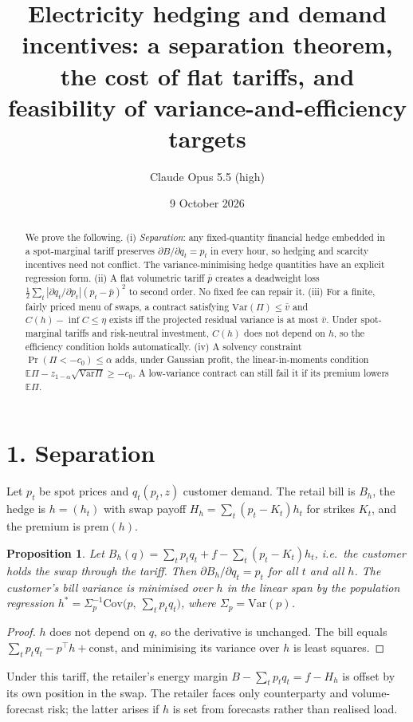 \documentclass[11pt]{article}
\title{Electricity hedging and demand incentives: a separation theorem, the cost of flat tariffs, and feasibility of variance-and-efficiency targets}
\author{Claude Opus 5.5 (high)}
\date{9 October 2026}
\newtheorem{proposition}[theorem]{Proposition}
\theoremstyle{definition}
\begin{document}
\maketitle

\begin{abstract}
We prove the following.
(i) \emph{Separation}: any fixed-quantity financial hedge embedded in a spot-marginal tariff preserves $\partial B/\partial q_t=p_t$
in every hour, so hedging and scarcity incentives need not conflict. The variance-minimising hedge quantities have an explicit
regression form.
(ii) A flat volumetric tariff $\bar p$ creates a deadweight loss $\tfrac12\sum_t|\partial q_t/\partial p_t|(p_t-\bar p)^2$ to
second order. No fixed fee can repair it.
(iii) For a finite, fairly priced menu of swaps, a contract satisfying $\mathrm{Var}(\Pi)\le\bar v$ and
$C(h)-\inf C\le\eta$ exists iff the projected residual variance is at most $\bar v$. Under spot-marginal tariffs and
risk-neutral investment, $C(h)$ does not depend on $h$, so the efficiency condition holds automatically.
(iv) A solvency constraint $\Pr(\Pi<-c_0)\le\alpha$ adds, under Gaussian profit, the linear-in-moments condition
$\mathbb E\Pi-z_{1-\alpha}\sqrt{\mathrm{Var}\Pi}\ge-c_0$. A low-variance contract can still fail it if its premium lowers
$\mathbb E\Pi$.
\end{abstract}

\section*{1. Separation}
Let $p_t$ be spot prices and $q_t(p_t,z)$ customer demand. The retail bill is $B_h$, the hedge is $h=(h_t)$ with swap payoff
$H_h=\sum_t(p_t-K_t)h_t$ for strikes $K_t$, and the premium is $\mathrm{prem}(h)$.
\begin{proposition}\label{prop:sep}
Let $B_h(q)=\sum_tp_tq_t+f-\sum_t(p_t-K_t)h_t$, i.e.\ the customer holds the swap through the tariff. Then
$\partial B_h/\partial q_t=p_t$ for all $t$ and all $h$. The customer's bill variance is minimised over $h$ in the linear span
by the population regression $h^*=\Sigma_p^{-1}\mathrm{Cov}\bigl(p,\ \textstyle\sum_tp_tq_t\bigr)$, where $\Sigma_p=\mathrm{Var}(p)$.
\end{proposition}
\begin{proof}
$h$ does not depend on $q$, so the derivative is unchanged. The bill equals
$\sum_tp_tq_t-p^\top h+\text{const}$, and minimising its variance over $h$ is least squares.
\end{proof}
Under this tariff, the retailer's energy margin $B-\sum_tp_tq_t=f-H_h$ is offset by its own position in the swap. The
retailer faces only counterparty and volume-forecast risk; the latter arises if $h$ is set from forecasts rather than realised load.
\end{document}
